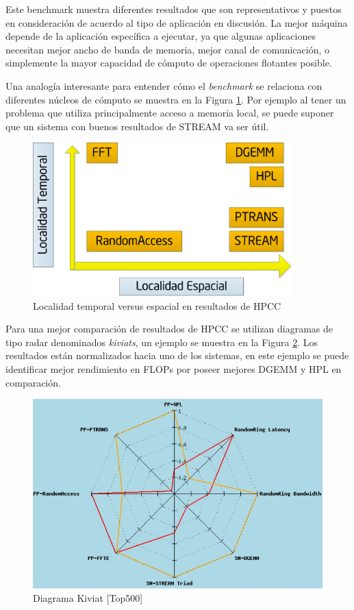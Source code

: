 \documentclass[a4paper]{report}
\begin{document}
\bigskip

Este benchmark muestra diferentes resultados que son representativos y puestos en consideración de acuerdo al tipo de aplicación en discusión.
La mejor máquina depende de la aplicación específica a ejecutar, ya que algunas aplicaciones necesitan mejor ancho de banda de memoria, mejor canal de comunicación, o
simplemente la mayor capacidad de cómputo de operaciones flotantes posible.

\bigskip

Una analogía interesante para entender cómo el {\it benchmark} se relaciona con diferentes núcleos de cómputo se muestra en la Figura \ref{fig:locality}. Por ejemplo al tener un problema que utiliza principalmente acceso a memoria local, se puede suponer que un sistema con buenos resultados de STREAM va ser útil.

\begin{figure}[H]
\begin{center}
\includegraphics[width=10cm]{locality.png}
\caption{Localidad temporal versus espacial en resultados de HPCC}
\label{fig:locality}
\end{center}
\end{figure}

Para una mejor comparación de resultados de HPCC se utilizan diagramas de tipo radar denominados {\it kiviats}, un ejemplo se muestra en la Figura \ref{fig:kiviat}.
Los resultados están normalizados hacia uno de los sistemas, en este ejemplo se puede identificar mejor rendimiento en FLOPs por poseer mejores DGEMM y HPL en comparación.

\begin{figure}[H]
\begin{center}
\includegraphics[width=12cm]{kiviat.png}
\caption{Diagrama Kiviat [Top500]}
\label{fig:kiviat}
\end{center}
\end{figure}
\end{document}
